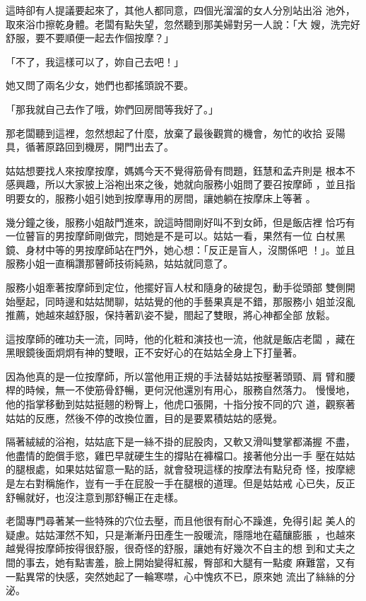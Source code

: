 這時卻有人提議要起來了，其他人都同意，四個光溜溜的女人分別站出浴
池外，取來浴巾擦乾身體。老闆有點失望，忽然聽到那美婦對另一人說：「大
嫂，洗完好舒服，要不要順便一起去作個按摩？」

「不了，我這樣可以了，妳自己去吧！」

她又問了兩名少女，她們也都搖頭說不要。

「那我就自己去作了哦，妳們回房間等我好了。」

那老闆聽到這裡，忽然想起了什麼，放棄了最後觀賞的機會，匆忙的收拾
妥陽具，循著原路回到機房，開門出去了。

姑姑想要找人來按摩按摩，媽媽今天不覺得筋骨有問題，鈺慧和孟卉則是
根本不感興趣，所以大家披上浴袍出來之後，她就向服務小姐問了要召按摩師
，並且指明要女的，服務小姐引她到按摩專用的房間，讓她躺在按摩床上等著
。

幾分鐘之後，服務小姐敲門進來，說這時間剛好叫不到女師，但是飯店裡
恰巧有一位瞽盲的男按摩師剛做完，問她是不是可以。姑姑一看，果然有一位
白杖黑鏡、身材中等的男按摩師站在門外，她心想：「反正是盲人，沒關係吧
！」。並且服務小姐一直稱讚那瞽師技術純熟，姑姑就同意了。

服務小姐牽著按摩師到定位，他擺好盲人杖和隨身的破提包，動手從頭部
雙側開始壓起，同時邊和姑姑閒聊，姑姑覺的他的手藝果真是不錯，那服務小
姐並沒亂推薦，她越來越舒服，保持著趴姿不變，閤起了雙眼，將心神都全部
放鬆。

這按摩師的確功夫一流，同時，他的化粧和演技也一流，他就是飯店老闆
，藏在黑眼鏡後面炯炯有神的雙眼，正不安好心的在姑姑全身上下打量著。

因為他真的是一位按摩師，所以當他用正規的手法替姑姑按壓著頭頸、肩
臂和腰桿的時候，無一不使筋骨舒暢，更何況他還別有用心，服務自然落力。
慢慢地，他的指掌移動到姑姑挺翹的粉臀上，他虎口張開，十指分按不同的穴
道，觀察著姑姑的反應，然後不停的改換位置，目的是要累積姑姑的感覺。

隔著絨絨的浴袍，姑姑底下是一絲不掛的屁股肉，又軟又滑叫雙掌都滿握
不盡，他盡情的飽償手慾，雞巴早就硬生生的撐貼在褲檔口。接著他分出一手
壓在姑姑的腿根處，如果姑姑留意一點的話，就會發現這樣的按摩法有點兒奇
怪，按摩總是左右對稱施作，豈有一手在屁股一手在腿根的道理。但是姑姑戒
心已失，反正舒暢就好，也沒注意到那舒暢正在走樣。

老闆專門尋著某一些特殊的穴位去壓，而且他很有耐心不躁進，免得引起
美人的疑慮。姑姑渾然不知，只是漸漸丹田產生一股暖流，隱隱地在蘊釀膨脹
，也越來越覺得按摩師按得很舒服，很奇怪的舒服，讓她有好幾次不自主的想
到和丈夫之間的事去，她有點害羞，臉上開始變得紅赧，臀部和大腿有一點痠
麻難當，又有一點異常的快感，突然她起了一輪寒噤，心中愧疚不已，原來她
流出了絲絲的分泌。

